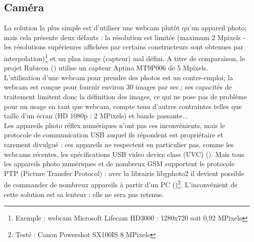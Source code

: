 \documentclass[a4paper,10pt]{report}
\begin{document}
\subsection{Caméra}
La solution la plus simple est d'utiliser une webcam plutôt qu'un appareil photo; mais cela présente deux défauts : la résolution est limitée (maximum 2 Mpixels - les résolutions supérieures affichées par certains constructeurs sont obtenues par interpolation)\footnote{Exemple : webcam Microsoft Lifecam HD3000 : 1280x720 soit 0,92 MPixels} et un plan image (capteur) mal défini.
A titre de comparaison, le projet Rubicon (\cite{rubicon}) utilise un capteur Aptina MT9P006 de 5 Mpixels.
\\
L'utilisation d'une webcam pour prendre des photos est un contre-emploi; la webcam est conçue pour fournir environ 30 images par sec.; ses capacités de traitement limitent donc la définition des images, ce qui ne pose pas de problème pour un usage en tant que webcam, compte tenu d'autres contraintes telles que taille d'un écran (HD 1080p : 2 MPixels) et bande passante...
\\
Les appareils photo réflex numériques n'ont pas ces inconvénients, mais le protocole de communication USB auquel ils répondent est propriétaire et rarement divulgué : ces appareils ne respectent en particulier pas, comme les webcams récentes, les spécifications USB video device class (UVC) ({\cite{UVC}}). Mais tous les appareils photo numériques et de nombreux GSM supportent le protocole PTP (Picture Transfer Protocol) : avec la librairie libgphoto2 il devient possible de commander de nombreux appareils à partir d'un PC (\cite{gPhoto,libgp2,cremote})\footnote{Testé : Canon Powershot SX100IS 8 MPixels}. L'inconvénient de cette solution est sa lenteur : elle ne sera pas retenue.
\end{document}
